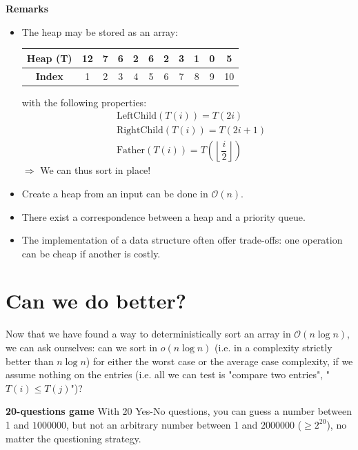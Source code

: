 \textbf{Remarks}
\begin{itemize}
\item The heap may be stored as an array: \\
\begin{center}
\begin{tabular}{|c|c|c|c|c|c|c|c|c|c|c|}
   \hline
   \textbf{Heap (T)} & 12 & 7 & 6 & 2 & 6 & 2 & 3 & 1 & 0 & 5 \\
   \hline 
   \textbf{Index} & 1 & 2 & 3 & 4 & 5 & 6 & 7 & 8 & 9 & 10 \\
   \hline
\end{tabular}
\end{center} 
\vspace*{0.4 cm} 
with the following properties:
\begin{align*}
& \text{LeftChild}(T(i)) = T(2i) \\
& \text{RightChild}(T(i)) = T(2i+1) \\
& \text{Father}(T(i)) = T\left( \left\lfloor\dfrac{i}{2}\right\rfloor \right)
\end{align*}
$\Rightarrow $ We can thus sort in place!

\item Create a heap from an input can be done in $\mathcal{O}(n)$.
\item There exist a correspondence between a heap and a priority queue.
\item The implementation of a data structure often offer trade-offs: one operation can be cheap if another is costly. 
\end{itemize}

\section{Can we do better?}

Now that we have found a way to deterministically sort an array in $\mathcal{O}(n\log n)$, we can ask ourselves: can we sort in $o(n \log n)$ (i.e. in a complexity strictly better than $n \log n$) for either the worst case or the average case complexity, if we assume nothing on the entries (i.e. all we can test is "compare two entries", "$T(i) \leq T(j)$")?\\

\begin{example}
\begin{leftbar}
\textbf{20-questions game} With $20$ Yes-No questions, you can guess a number between 1 and $1000000$, but not an arbitrary number between 1 and $2000000$ ($\geq 2^{20}$), no matter the questioning strategy.
\end{leftbar}
\end{example}

